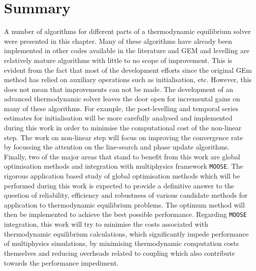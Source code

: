 \section{Summary}
	A number of algorithms for different parts of a thermodynamic equilibrium solver were presented in this chapter. Many of these algorithms have already been implemented in other codes available in the literature and GEM and levelling are relatively mature algorithms with little to no scope of improvement. This is evident from the fact that most of the development efforts since the original GEm method has relied on auxiliary operations such as initialisation, etc. However, this does not mean that improvements can not be made.  The development of an advanced thermodynamic solver leaves the door open for incremental gains on many of these algorithms.
For example, the post-levelling and temporal series estimates for initialisation will be more carefully analysed and implemented during this work in order to minimise the computational cost of the non-linear step. The work on non-linear step will focus on improving the convergence rate by focussing the attention on the line-search and phase update algorithms. Finally, two of the major areas that stand to benefit from this work are global optimisation methods and integration with multiphysics framework \texttt{MOOSE}. The rigorous application based study of global optimisation methods which will be performed during this work is expected to provide a definitive answer to the question of reliability, efficiency and robustness of various candidate methods for application to thermodynamic equilibrium problems. The optimum method will then be implemented to achieve the best possible performance. Regarding \texttt{MOOSE} integration, this work will try to minimise the costs associated with thermodynamic equilibrium calculations, which significantly impede performance of multiphysics simulations, by minimising thermodynamic computation costs themselves  and reducing overheads  related to coupling which also contribute towards the performance impediment.
